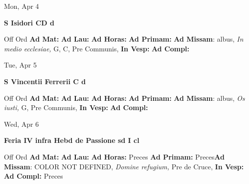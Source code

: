 \documentclass[10pt]{book}
\begin{document}
\begin{center}
\begin{minipage}{3.5in}
\vspace{2em}
\begin{center}Mon, Apr 4
\end{center}
\textbf{ \large S Isidori CD
\textnormal{\normalsize d}}

\begin{justify}Off Ord
\textbf{Ad Mat: }
\textbf{Ad Lau: }
\textbf{Ad Horas: }
\textbf{Ad Primam: }\textbf{Ad Missam}: albus, \textit{In medio ecclesiae,} G, C, Pre Communis, 
\textbf{In Vesp: }
\textbf{Ad Compl: }
\end{justify}
\end{minipage}
\end{center}

\begin{center}
\begin{minipage}{3.5in}
\vspace{2em}
\begin{center}Tue, Apr 5
\end{center}
\textbf{ \large S Vincentii Ferrerii C
\textnormal{\normalsize d}}

\begin{justify}Off Ord
\textbf{Ad Mat: }
\textbf{Ad Lau: }
\textbf{Ad Horas: }
\textbf{Ad Primam: }\textbf{Ad Missam}: albus, \textit{Os iusti,} G, Pre Communis, 
\textbf{In Vesp: }
\textbf{Ad Compl: }
\end{justify}
\end{minipage}
\end{center}

\begin{center}
\begin{minipage}{3.5in}
\vspace{2em}
\begin{center}Wed, Apr 6
\end{center}
\textbf{ \large Feria IV infra Hebd de Passione
\textnormal{\normalsize sd I cl}}

\begin{justify}Off Ord
\textbf{Ad Mat: }
\textbf{Ad Lau: }
\textbf{Ad Horas: }Preces
\textbf{Ad Primam: }Preces\textbf{Ad Missam}: COLOR NOT DEFINED, \textit{Domine refugium,} Pre de Cruce, 
\textbf{In Vesp: }
\textbf{Ad Compl: }Preces
\end{justify}
\end{minipage}
\end{center}
\end{document}
